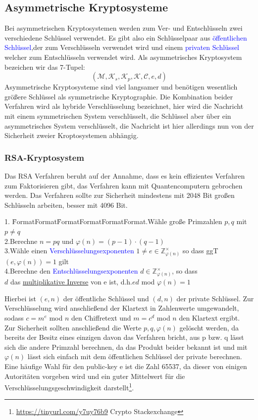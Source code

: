 \documentclass[a4paper,12pt]{article}
\newcommand{\blue}[1]{\textcolor{blue}{#1}}
\begin{document}
\subsection{Asymmetrische Kryptosysteme}
Bei asymmetrischen Kryptosystemen werden zum Ver- und Entschlüsseln zwei verschiedene Schlüssel verwendet. Es gibt also ein Schlüsselpaar aus \blue{öffentlichen Schlüssel},der zum Verschlüsseln verwendet wird und einem \blue{privaten Schlüssel} welcher zum Entschlüsseln verwendet wird.
Als asymmetrisches Kryptosystem bezeichen wir das 7-Tupel: $$(\mathcal{M},\mathcal{K}_s, \mathcal{K}_p,\mathcal{K},\mathcal{C},e,d)$$
Asymmetrische Kryptosysteme sind viel langsamer und benötigen wesentlich größere Schlüssel als symmetrische Kryptographie. Die Kombination beider Verfahren wird als hybride Verschlüsselung bezeichnet, hier wird die Nachricht mit einem symmetrischen System verschlüsselt, die Schlüssel aber über ein asymmetrisches System verschlüsselt, die Nachricht ist hier allerdings nun von der Sicherheit zweier Kroptosystemen abhängig.
\subsubsection{RSA-Kryptosystem}
Das RSA Verfahren beruht auf der Annahme, dass es kein effizientes Verfahren zum Faktorisieren gibt, das Verfahren kann mit Quantencomputern gebrochen werden.
Das Verfahren sollte zur Sicherheit mindestens mit 2048 Bit großen Schlüsseln arbeiten, besser mit 4096 Bit.
\begin{tabbing}
1. \= FormatFormat\= FormatFormatFormatFormat.\>Wähle große Primzahlen $p,q$ mit $p\neq q$\\
2.\>Berechne $n=pq$ und $\varphi(n)=(p-1)\cdot(q-1)$\\
3.\>Wähle einen \blue{Verschlüsselungsexponenten} $1\neq e\in \mathbb{Z}_{\varphi(n)}^\times$ so dass ggT$(e,\varphi(n))=1$ gilt\\
4.\>Berechne den \blue{Entschlüsselungsexponenten} $d\in\mathbb{Z}_{\varphi(n)}^\times$, so dass \\
\>\>$d$ das \hyperref[sec:euklid]{multiplikative Inverse} von e ist, d.h.$ed$ mod $\varphi(n)=1$
\end{tabbing}
Hierbei ist $(e,n)$ der öffentliche Schlüssel und $(d,n)$ der private Schlüssel.
Zur Verschlüsselung wird anschließend der Klartext in Zahlenwerte umgewandelt, sodass $c=m^e$ mod $n$ den Chiffretext und $m = c^d$ mod $n$ den Klartext ergibt.\\
Zur Sicherheit sollten anschließend die Werte $p,q,\varphi(n)$ gelöscht werden, da bereits der Besitz eines einzigen davon das Verfahren bricht, aus p bzw. q lässt sich die andere Primzahl berechnen, da das Produkt beider bekannt ist und mit $\varphi(n)$ lässt sich einfach mit dem öffentlichen Schlüssel der private berechnen.\\ Eine häufige Wahl für den public-key e ist die Zahl 65537, da dieser von einigen Autoritäten vorgeben wird und ein guter Mittelwert für die Verschlüsselungsgeschwindigkeit darstellt\footnote{\url{https://tinyurl.com/y7uy76b9} Crypto Stackexchange}.
\end{document}
